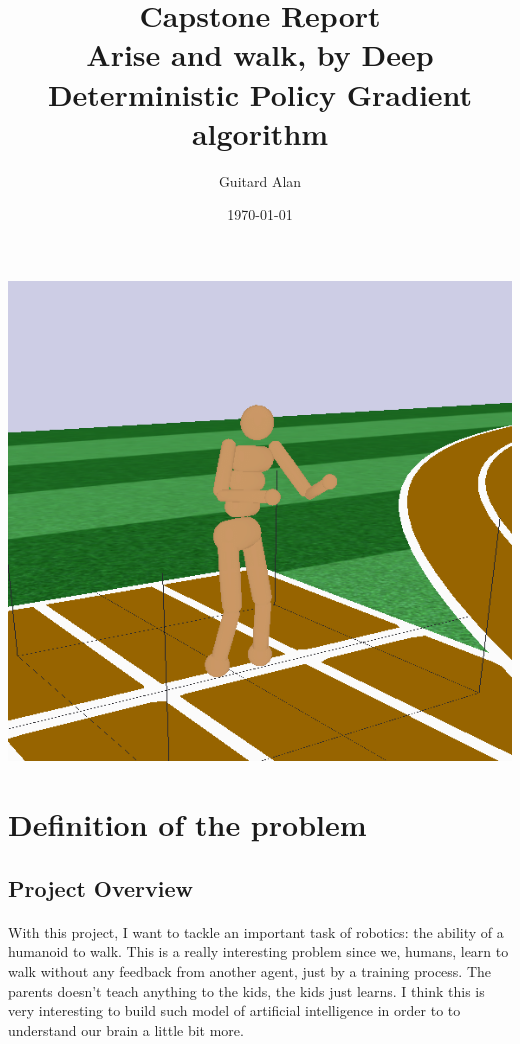 \documentclass{article}
\title{\textbf{Capstone Report}\\Arise and walk, by Deep Deterministic Policy Gradient algorithm}
\date{\today}
\author{Guitard Alan}
\begin{document}
\maketitle

\includegraphics[width=\textwidth]{roboschoolhumanoid}
\justify

\section{Definition of the problem}

\subsection{Project Overview}
\paragraph{}
With this project, I want to tackle an important task of robotics: the ability
of a humanoid to walk. This is a really interesting problem since we, humans, learn
to walk without any feedback from another agent, just by a training process. The
parents doesn't teach anything to the kids, the kids just learns. I think this
is very interesting to build such model of artificial intelligence in order to
to understand our brain a little bit more.
\end{document}
